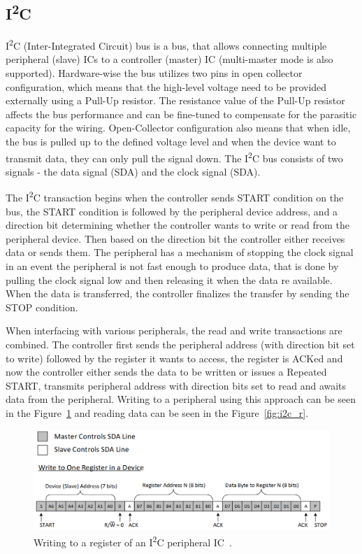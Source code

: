 \subsection{I\textsuperscript{2}C}
\label{subsec:i2c}
I\textsuperscript{2}C (Inter-Integrated Circuit) bus is a bus, that allows connecting multiple peripheral (slave) ICs to a controller (master) IC (multi-master mode is also supported)\cite{sfuptownmaker_i2c_2021}.
Hardware-wise the bus utilizes two pins in open collector configuration, which means that the high-level voltage need to be provided externally using a Pull-Up resistor.
The resistance value of the Pull-Up resistor affects the bus performance and can be fine-tuned to compensate for the parasitic capacity for the wiring.
Open-Collector configuration also means that when idle, the bus is pulled up to the defined voltage level and when the device want to transmit data, they can only pull the signal down.
The I\textsuperscript{2}C bus consists of two signals - the data signal (SDA) and the clock signal (SDA).

The I\textsuperscript{2}C transaction begins when the controller sends START condition on the bus, the START condition is followed by the peripheral device address, and a direction bit determining whether the controller wants to write or read from the peripheral device\cite{sfuptownmaker_i2c_2021}.
Then based on the direction bit the controller either receives data or sends them.
The peripheral has a mechanism of stopping the clock signal in an event the peripheral is not fast enough to produce data, that is done by pulling the clock signal low and then releasing it when the data re available.
When the data is transferred, the controller finalizes the transfer by sending the STOP condition.

When interfacing with various peripherals, the read and write transactions are combined\cite{valdez_understanding_2015}.
The controller first sends the peripheral address (with direction bit set to write) followed by the register it wants to access, the register is ACKed and now the controller either sends the data to be written or issues a Repeated START, transmits peripheral address with direction bits set to read and awaits data from the peripheral.
Writing to a peripheral using this approach can be seen in the Figure~\ref{fig:i2c_w} and reading data can be seen in the Figure~\ref{fig:i2c_r}.

\begin{figure}[H]
    \centering
    \includegraphics[width=\textwidth]{obrazky/i2c_w}
    \caption{Writing to a register of an I\textsuperscript{2}C peripheral IC~\cite{valdez_understanding_2015}.}
    \label{fig:i2c_w}
\end{figure}

